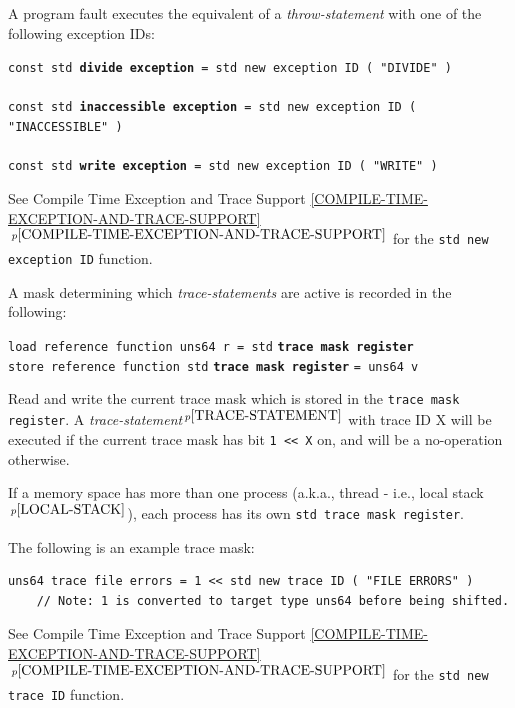\documentclass[12pt]{article}
\newcommand{\ttkey}[1]{{\tt \bfseries #1}}
\newcommand{\itemref}[1]{\ref{#1}$\,^{p\pageref{#1}}$}
\newcommand{\pagnote}[1]{$\,^{p\pageref{#1}}$}
\newenvironment{indpar}[1][0.3in]%
	{\begin{list}{}%
		     {\setlength{\itemsep}{0in}%
		      \setlength{\topsep}{0in}%
		      \setlength{\parsep}{1ex}%
		      \setlength{\labelwidth}{#1}%
		      \setlength{\leftmargin}{#1}%
		      \addtolength{\leftmargin}{\labelsep}}%
	 \item}%
	{\end{list}}
\begin{document}
A program fault executes the equivalent of a {\em throw-statement}
with one of the following exception IDs:

{\tt const std \ttkey{divide exception} = std new exception ID ( "DIVIDE" )} \\
\hspace*{1in}{\tt // Integer divide by zero.} \\
{\tt const std \ttkey{inaccessible exception} = std new exception ID ( "INACCESSIBLE" )} \\
\hspace*{1in}{\tt // Read or write of inaccessible memory location.}  \\
{\tt const std \ttkey{write exception} = std new exception ID ( "WRITE" )} \\
\hspace*{1in}{\tt // Write of accessible but write-protected
                  memory location.}

See Compile Time Exception and Trace Support
\itemref{COMPILE-TIME-EXCEPTION-AND-TRACE-SUPPORT}
for the {\tt std new exception ID} function.

A mask determining which {\em trace-statements} are active
is recorded in the following:

{\tt load reference function uns64 r = std} \ttkey{trace mask register}%
\label{CURRENT-TRACE-MASK} \\
{\tt store reference function std} \ttkey{trace mask register} {\tt = uns64 v}
\begin{indpar}
Read and write the current trace mask which is stored in the
{\tt trace mask register}.
A {\em trace-statement}\pagnote{TRACE-STATEMENT} with trace ID X
will be executed if the current trace mask has bit {\tt 1 <{}< X}
on, and will be a no-operation otherwise.
\end{indpar}

If a memory space has more than one process (a.k.a., thread - i.e., local
stack\pagnote{LOCAL-STACK}), each process has its own
{\tt std trace mask register}.

The following is an example trace mask:
\begin{indpar}\begin{verbatim}
uns64 trace file errors = 1 << std new trace ID ( "FILE ERRORS" )
    // Note: 1 is converted to target type uns64 before being shifted.
\end{verbatim}\end{indpar}

See Compile Time Exception and Trace Support
\itemref{COMPILE-TIME-EXCEPTION-AND-TRACE-SUPPORT}
for the {\tt std new trace ID} function.
\end{document}
